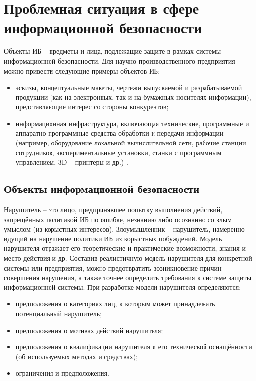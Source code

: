 
\section{Проблемная ситуация в сфере информационной безопасности}
\label{sec:problems}

Объекты ИБ -- предметы и лица, подлежащие защите в рамках системы информационной безопасности.
Для научно-производственного предприятия можно привести следующие примеры объектов ИБ:
\begin{itemize}
	\item эскизы, концептуальные макеты, чертежи выпускаемой и разрабатываемой продукции (как на электронных, так и на бумажных носителях информации), представляющие интерес со стороны конкурентов;
	\item информационная инфраструктура, включающая технические, программные и аппаратно-программные средства обработки и передачи информации (например, оборудование локальной вычислительной сети, рабочие станции сотрудников, экспериментальные установки, станки с программным управлением, 3D – принтеры и др.) \cite{national_traffic_exchange}.
\end{itemize}

\subsection{Объекты информационной безопасности}
\label{subsec:problems:objects}

Нарушитель -- это лицо, предпринявшее попытку выполнения действий, запрещённых политикой ИБ по ошибке, незнанию либо осознанно со злым умыслом (из корыстных интересов).
Злоумышленник -- нарушитель, намеренно идущий на нарушение политики ИБ из корыстных побуждений.
Модель нарушителя отражает его теоретические и практические возможности, знания и место действия и др.
Составив реалистичную модель нарушителя для конкретной системы или предприятия, можно предотвратить возникновение причин совершения нарушения, а также точнее определить требования к системе защиты информационной системы.
При разработке модели нарушителя определяются:
\begin{itemize}
	\item предположения о категориях лиц, к которым может принадлежать потенциальный нарушитель;
	\item предположения о мотивах действий нарушителя;
	\item предположения о квалификации нарушителя и его технической оснащённости (об используемых методах и средствах);
	\item ограничения и предположения.
\end{itemize}

